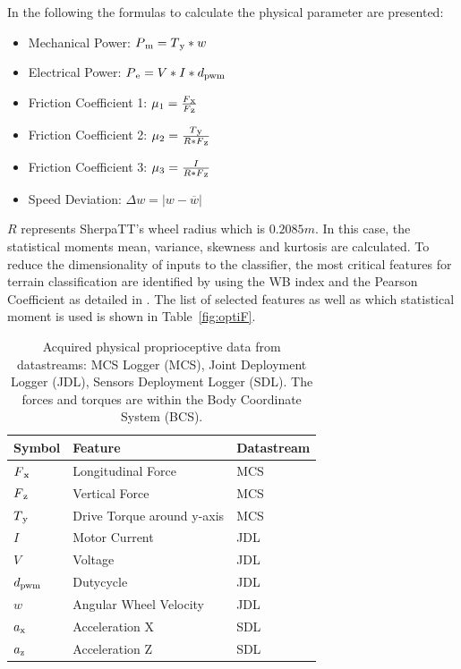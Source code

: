 \documentclass{article}
\begin{document}
 In the following the formulas to calculate the physical parameter are presented:
\begin{itemize}
\item Mechanical Power: $ P\textsubscript{m} = T\textsubscript{y} * w $
\item Electrical Power: $ P\textsubscript{e} = V* I * d\textsubscript{pwm}$
\item Friction Coefficient 1: $\mu \textsubscript{1} = \frac{F\textsubscript{x}}{F\textsubscript{z}} $
\item Friction Coefficient 2: $\mu \textsubscript{2} = \frac{T\textsubscript{y}}{R * F\textsubscript{z}}$ 
\item Friction Coefficient 3: $\mu \textsubscript{3} = \frac{I}{R * F\textsubscript{z}}$
\item Speed Deviation:	 $\Delta w = |w-\overline{w}| $
\end{itemize}
$R$ represents SherpaTT's wheel radius which is $0.2085m$.
In this case, the statistical moments mean, variance, skewness and kurtosis are calculated. 
To reduce the dimensionality of inputs to the classifier, the most critical features for terrain classification are identified by using the WB index and the Pearson Coefficient as detailed in \cite{Dimastrogiovanni2020}. 
The list of selected features as well as which statistical moment is used is shown in Table~\ref{fig:optiF}.

\begin{table}[htb!]
   \centering
    \caption{Acquired physical proprioceptive data from datastreams: MCS Logger (MCS), Joint Deployment Logger (JDL), Sensors Deployment Logger (SDL). The forces and torques are within the Body Coordinate System (BCS).\cite{Dimastrogiovanni2020}\label{fig:features1}}
    \begin{tabularx}{\columnwidth}{XXX}
    \textbf{Symbol}& \textbf{Feature} & \textbf{Datastream}  \\
    \hline
      $F\textsubscript{x}$ & Longitudinal Force	 &  MCS\\
      $F\textsubscript{z}$& Vertical Force	 &MCS \\ 
      $T\textsubscript{y}$& Drive Torque around y-axis	   &MCS\\ 
      $I $& Motor Current	  & JDL\\ 
      $V$ & Voltage 	   &JDL\\ 
      $d\textsubscript{pwm}$&  Dutycycle	   &JDL\\ 
      $w$& Angular Wheel Velocity 	 &JDL \\
      $a\textsubscript{x}$& Acceleration X	  &SDL\\ 
      $a\textsubscript{z}$&  Acceleration Z	   &SDL\\ 
    \end{tabularx}
\end{table}
\end{document}
